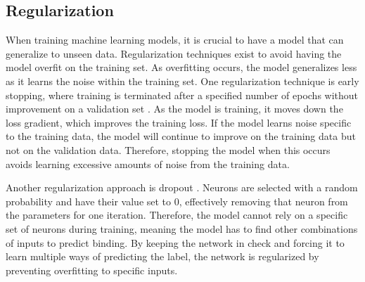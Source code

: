 
\subsection{Regularization}
When training machine learning models, it is crucial to have a model that can generalize to unseen data. Regularization techniques exist to avoid having the model overfit on the training set. As overfitting occurs, the model generalizes less as it learns the noise within the training set. One regularization technique is early stopping, where training is terminated after a specified number of epochs without improvement on a validation set \cite{Jurtz2017AnSolutions}. As the model is training, it moves down the loss gradient, which improves the training loss. If the model learns noise specific to the training data, the model will continue to improve on the training data but not on the validation data. Therefore, stopping the model when this occurs avoids learning excessive amounts of noise from the training data.

Another regularization approach is dropout \cite{JMLR:v15:srivastava14a}. Neurons are selected with a random probability and have their value set to 0, effectively removing that neuron from the parameters for one iteration. Therefore, the model cannot rely on a specific set of neurons during training, meaning the model has to find other combinations of inputs to predict binding. By keeping the network in check and forcing it to learn multiple ways of predicting the label, the network is regularized by preventing overfitting to specific inputs.

